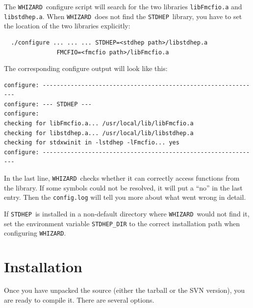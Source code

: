 \documentclass[12pt]{book}
\newcommand{\ttt}[1]{\texttt{#1}}
\newcommand{\whizard}{\texttt{WHIZARD}}
\newcommand{\stdhep}{\texttt{STDHEP}}
\begin{document}
The \whizard\ configure script will search for the two libraries  
\ttt{libFmcfio.a} and \ttt{libstdhep.a}. When \whizard\ does not find
the \stdhep\ library, you have to set the location of the two libraries
explicitly: 
\begin{verbatim}
  ./configure ... ... ... STDHEP=<stdhep path>/libstdhep.a 
               FMCFIO=<fmcfio path>/libFmcfio.a
\end{verbatim}
The  corresponding configure output will look like this:
\begin{verbatim}
configure: --------------------------------------------------------------
configure: --- STDHEP ---
configure:
checking for libFmcfio.a... /usr/local/lib/libFmcfio.a
checking for libstdhep.a... /usr/local/lib/libstdhep.a
checking for stdxwinit in -lstdhep -lFmcfio... yes
configure: -------------------------------------------------------------- 
\end{verbatim}
In the last line, \whizard\ checks whether it can correctly access
functions from the library. If some symbols could not be resolved, it
will put a ``no'' in the last entry. Then the \ttt{config.log} will
tell you more about what went wrong in detail.

If \stdhep\ is installed in a non-default directory where
\whizard\ would not find it, set the environment variable
\ttt{STDHEP\_DIR} to the correct installation path when configuring
\whizard.


\section{Installation}
\label{sec:installation}

Once you have unpacked the source (either the tarball or the SVN
version), you are ready to compile it.  There are several options.
\end{document}
